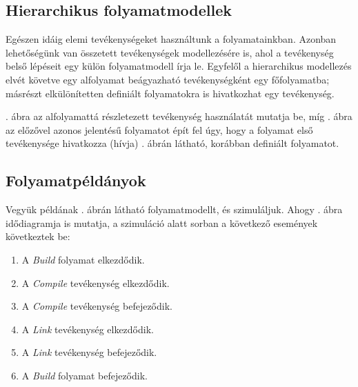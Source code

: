 \subsection{Hierarchikus folyamatmodellek}
Egészen idáig elemi tevékenységeket használtunk a folyamatainkban. Azonban lehetőségünk van összetett tevékenységek modellezésére is, ahol a tevékenység belső lépéseit egy külön folyamatmodell írja le. Egyfelől a hierarchikus modellezés elvét követve egy alfolyamat beágyazható tevékenységként egy főfolyamatba; másrészt elkülönítetten definiált folyamatokra is hivatkozhat egy tevékenység.  

\begin{pelda}
. ábra az alfolyamattá részletezett tevékenység használatát mutatja be, míg . ábra az előzővel azonos jelentésű folyamatot épít fel úgy, hogy a folyamat első tevékenysége hivatkozza (hívja) . ábrán látható, korábban definiált folyamatot.
\end{pelda}




% 
% 
% 
% 


\subsection{Folyamatpéldányok}

\begin{pelda}
Vegyük példának . ábrán látható folyamatmodellt, és szimuláljuk. Ahogy . ábra idődiagramja is mutatja, a szimuláció alatt sorban a következő események következtek be: \begin{enumerate}
  \item A \emph{Build} folyamat elkezdődik.
  \item A \emph{Compile} tevékenység elkezdődik.
  \item A \emph{Compile} tevékenység befejeződik.
  \item A \emph{Link} tevékenység elkezdődik.
  \item A \emph{Link} tevékenység befejeződik.
  \item A \emph{Build} folyamat befejeződik.
\end{enumerate}
\end{pelda}

